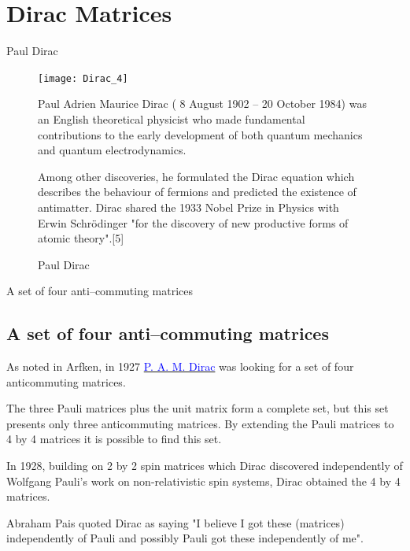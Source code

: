 \documentclass[10pt]{beamer}
\begin{document}
\section{Dirac Matrices}


\begin{frame}[shrink=10]{Paul Dirac}
\begin{figure}[htb]

\begin{center}
\texttt{[image: Dirac\_4]}
\end{center}

\caption{Paul Dirac}

Paul Adrien Maurice Dirac  ( 8 August 1902 -- 20 October 1984) was an English theoretical physicist who made fundamental contributions to the early development of both quantum mechanics and quantum electrodynamics. 

Among other discoveries, he formulated the Dirac equation which describes the behaviour of fermions and predicted the existence of antimatter. Dirac shared the 1933 Nobel Prize in Physics with Erwin Schr\"odinger "for the discovery of new productive forms of atomic theory".[5] 
\end{figure}

\end{frame}


\begin{frame}[fragile]{A set of four anti--commuting matrices}
\subsection{A set of four anti--commuting matrices}
As noted in Arfken, in 1927   \href{https://en.wikipedia.org/wiki/Paul_Dirac}{\textcolor{blue}{P. A. M. Dirac}} was looking for a set of four anticommuting matrices. 

The three Pauli matrices plus the unit  matrix form a complete set, but this set presents only three anticommuting matrices. By extending the Pauli matrices to 4 by 4 matrices it is possible to find this set. 

In 1928, building on 2 by 2 spin matrices which Dirac discovered independently of Wolfgang Pauli's work on non-relativistic spin systems, Dirac obtained the 4 by 4 matrices. 

\alert{Abraham Pais quoted Dirac as saying "I believe I got these (matrices) independently of Pauli and possibly Pauli got these independently of me"}.

\end{frame}
\end{document}
